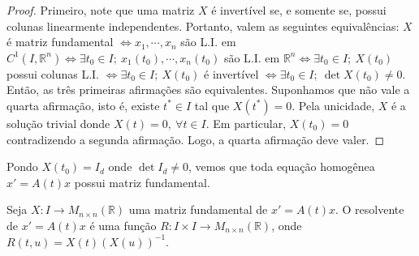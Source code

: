 \documentclass[a4paper, 12pt]{article}
\renewcommand{\Bbb}{\mathbb}
\begin{document}
\begin{proof}
Primeiro, note que uma matriz $X$ é invertível se, e somente se, possui colunas linearmente independentes. Portanto, valem as seguintes equivalências: $X$ é matriz fundamental $\iff x_1,\cdots,x_n$ são L.I. em $C^1(I,\Bbb R^n) \iff \exists t_0\in I;\ x_1(t_0),\cdots,x_n(t_0)$ são L.I. em $\Bbb R^n \iff \exists t_0\in I;\ X(t_0)$ possui colunas L.I. $\iff \exists t_0\in I;\ X(t_0)$ é invertível $\iff \exists t_0\in I;\ \det X(t_0) \neq 0$. Então, as três primeiras afirmações são equivalentes. Suponhamos que não vale a quarta afirmação, isto é, existe $t^*\in I$ tal que $X(t^*)=0$. Pela unicidade, $X$ é a solução trivial donde $X(t)=0,\ \forall t\in I$. Em particular, $X(t_0)=0$ contradizendo a segunda afirmação. Logo, a quarta afirmação deve valer.
\end{proof}
Pondo $X(t_0) = I_d$ onde $\det I_d \neq 0$, vemos que toda equação homogênea $x'=A(t)x$ possui matriz fundamental.

Seja $X:I\to M_{n\times n}(\Bbb R)$ uma matriz fundamental de $x' = A(t)x$. O resolvente de $x'=A(t)x$ é uma função $R:I\times I\to M_{n\times n}(\Bbb R)$, onde $R(t,u)=X(t)(X(u))^{-1}$.
\end{document}
